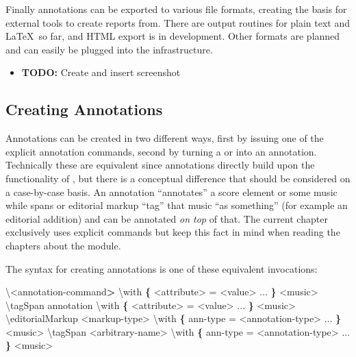\documentclass[]{ollmanual}
\newenvironment{Shaded}{}{}
\newcommand{\DataTypeTok}[1]{\textcolor[rgb]{0.56,0.13,0.00}{#1}}
\newcommand{\ErrorTok}[1]{\textcolor[rgb]{1.00,0.00,0.00}{\textbf{#1}}}
\newcommand{\FunctionTok}[1]{\textcolor[rgb]{0.02,0.16,0.49}{#1}}
\newcommand{\KeywordTok}[1]{\textcolor[rgb]{0.00,0.44,0.13}{\textbf{#1}}}
\newcommand{\NormalTok}[1]{#1}
\newcommand{\StringTok}[1]{\textcolor[rgb]{0.25,0.44,0.63}{#1}}
\providecommand{\tightlist}{%
  \setlength{\itemsep}{0pt}\setlength{\parskip}{0pt}}
\begin{document}
Finally annotations can be exported to various file formats, creating
the basis for external tools to create reports from. There are output
routines for plain text and \LaTeX~so far, and HTML export is in
development. Other formats are planned and can easily be plugged into
the infrastructure.

\begin{itemize}
\tightlist
\item
  \textbf{TODO:} Create and insert screenshot
\end{itemize}

\hypertarget{creating-annotations}{%
\subsection{Creating Annotations}\label{creating-annotations}}

Annotations can be created in two different ways, first by issuing one
of the explicit annotation commands, second by turning a 
or  into an annotation. Technically these are
equivalent since annotations directly build upon the functionality of
, but there is a conceptual difference that should be
considered on a case-by-case basis. An annotation ``annotates'' a score
element or some music while spans or editorial markup ``tag'' that music
``as something'' (for example an editorial addition) and can be
annotated \emph{on top} of that. The current chapter exclusively uses
explicit commands but keep this fact in mind when reading the chapters
about the  module.

The syntax for creating annotations is one of these equivalent
invocations:

\begin{Shaded}
\begin{Highlighting}[]
\StringTok{\textbackslash{}<}\NormalTok{annotation-command}\ErrorTok{>}\NormalTok{ \textbackslash{}with}\KeywordTok{ \{}\NormalTok{ <attribute> = <value> ... }\KeywordTok{\}} \DataTypeTok{<}\NormalTok{music>}
\FunctionTok{\textbackslash{}tagSpan}\NormalTok{ annotation \textbackslash{}with}\KeywordTok{ \{}\NormalTok{ <attribute> = <value> ... }\KeywordTok{\}} \DataTypeTok{<}\NormalTok{music>}
\FunctionTok{\textbackslash{}editorialMarkup} \DataTypeTok{<}\NormalTok{markup-type> \textbackslash{}with}\KeywordTok{ \{}\NormalTok{ ann-type = <annotation-type> ... }\KeywordTok{\}} \DataTypeTok{<}\NormalTok{music>}
\FunctionTok{\textbackslash{}tagSpan} \DataTypeTok{<}\NormalTok{arbitrary-name> \textbackslash{}with}\KeywordTok{ \{}\NormalTok{ ann-type = <annotation-type> ... }\KeywordTok{\}} \DataTypeTok{<}\NormalTok{music>}
\end{Highlighting}
\end{Shaded}
\end{document}
